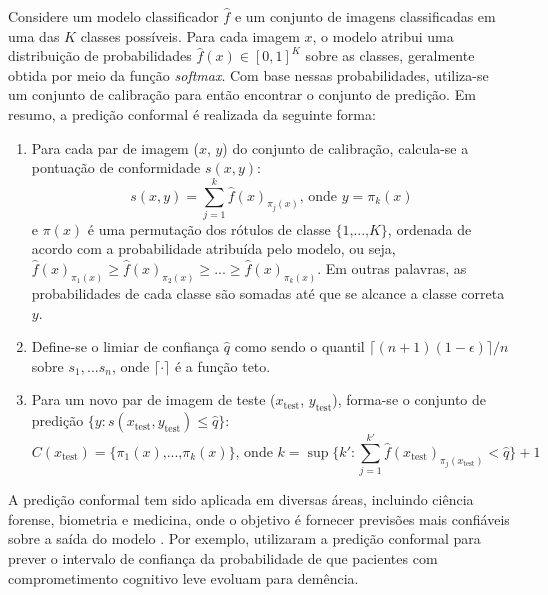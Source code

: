 Considere um modelo classificador $\hat{f}$ e um conjunto de imagens classificadas em uma das $K$ classes possíveis. Para cada imagem $x$, o modelo atribui uma distribuição de probabilidades $\hat{f}(x) \in [0,1]^K$ sobre as classes, geralmente obtida por meio da função \textit{softmax}. Com base nessas probabilidades, utiliza-se um conjunto de calibração para então encontrar o conjunto de predição. Em resumo, a predição conformal é realizada da seguinte forma:

\begin{enumerate}
    \item Para cada par de imagem ($x$, $y$) do conjunto de calibração, calcula-se a pontuação de conformidade $s(x,y)$:
    \begin{equation}
        s(x,y) = \sum_{j=1}^{k} \hat{f}(x)_{\pi_j(x)}\text{, onde } y = \pi_k(x)
    \end{equation}
    e $\pi(x)$ é uma permutação dos rótulos de classe $\lbrace 1 \text{,...,} K \rbrace$, ordenada de acordo com a probabilidade atribuída pelo modelo, ou seja, $\hat{f}(x)_{\pi_1(x)} \geq \hat{f}(x)_{\pi_2(x)} \geq ... \geq \hat{f}(x)_{\pi_k(x)}$. Em outras palavras, as probabilidades de cada classe são somadas até que se alcance a classe correta $y$.

    \item Define-se o limiar de confiança $\hat{q}$ como sendo o quantil ${\lceil (n+1)(1-\epsilon) \rceil}/n$ sobre $s_1, ... s_n$, onde $\lceil \cdot \rceil$ é a função teto.
    \item Para um novo par de imagem de teste ($x_{\text{test}}$, $y_{\text{test}}$), forma-se o conjunto de predição $\lbrace y:s(x_{\text{test}},y_{\text{test}}) \leq \hat{q} \rbrace$:
    \begin{equation}
        C(x_{\text{test}}) = \lbrace \pi_1(x) \text{,...,} \pi_k(x) \rbrace \text{, onde } k = \sup \Bigg\lbrace k' : \sum_{j=1}^{k'} \hat{f}(x_{\text{test}})_{\pi_j(x_{\text{test}})} < \hat{q} \Bigg\rbrace + 1
    \end{equation}
\end{enumerate}

A predição conformal tem sido aplicada em diversas áreas, incluindo ciência forense, biometria e medicina, onde o objetivo é fornecer previsões mais confiáveis sobre a saída do modelo \cite{Fontana2023}. Por exemplo,  utilizaram a predição conformal para prever o intervalo de confiança da probabilidade de que pacientes com comprometimento cognitivo leve evoluam para demência.

